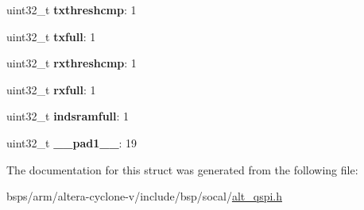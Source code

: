 \begin{DoxyCompactItemize}
\mbox{\label{structALT__QSPI__IRQSTAT__s_ab535792c911d39f3c3d66d6fa8908bfe}} 
uint32\+\_\+t {\bfseries txthreshcmp}\+: 1
\item 
\mbox{\label{structALT__QSPI__IRQSTAT__s_a3c6b4bbecd3034f9ebc622efbfdc4a11}} 
uint32\+\_\+t {\bfseries txfull}\+: 1
\item 
\mbox{\label{structALT__QSPI__IRQSTAT__s_aa8455635a0d0a40b0e268f732d9e0a76}} 
uint32\+\_\+t {\bfseries rxthreshcmp}\+: 1
\item 
\mbox{\label{structALT__QSPI__IRQSTAT__s_abc41574858cb9680db82f78108c3caf0}} 
uint32\+\_\+t {\bfseries rxfull}\+: 1
\item 
\mbox{\label{structALT__QSPI__IRQSTAT__s_a5d8e9b249922afc64a27fee14d7b4240}} 
uint32\+\_\+t {\bfseries indsramfull}\+: 1
\item 
\mbox{\label{structALT__QSPI__IRQSTAT__s_abac9cc896059467e389afafc1ab584b9}} 
uint32\+\_\+t {\bfseries \+\_\+\+\_\+pad1\+\_\+\+\_\+}\+: 19
\end{DoxyCompactItemize}


The documentation for this struct was generated from the following file\+:\begin{DoxyCompactItemize}
\item 
bsps/arm/altera-\/cyclone-\/v/include/bsp/socal/\mbox{\hyperlink{include_2bsp_2socal_2alt__qspi_8h}{alt\+\_\+qspi.\+h}}\end{DoxyCompactItemize}

